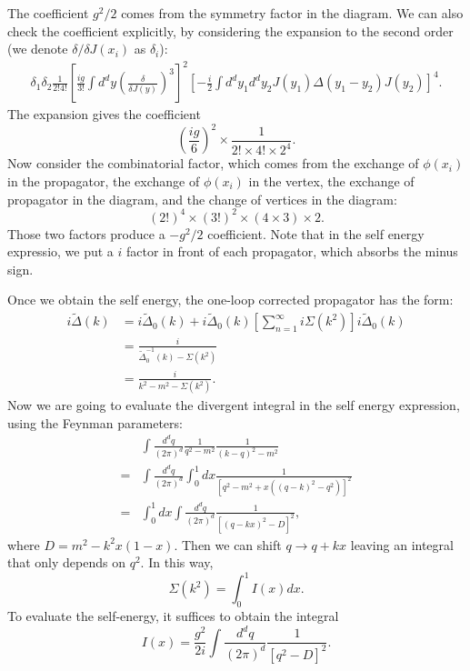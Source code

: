 The coefficient $g^2/2$ comes from the symmetry factor in the diagram. We can also check the coefficient explicitly, by considering the expansion to the second order (we denote $\delta/\delta J(x_i)$ as $\delta_i$):
\begin{equation*}
\begin{aligned}
	\delta_{1}\delta_{2}\frac{1}{2!4!}\left[\frac{ig}{3!}\int d^dy \left(\frac{\delta}{\delta J(y)}\right)^3 \right]^2
	\left[-\frac{i}{2}\int d^dy_1 d^dy_2 J(y_1)\Delta(y_1-y_2)J(y_2)\right]^4.
\end{aligned}
\end{equation*}
The expansion gives the coefficient
\begin{equation*}
	\left(\frac{ig}{6}\right)^2\times \frac{1}{2!\times 4! \times 2^4}.
\end{equation*}
Now consider the combinatorial factor, which comes from the exchange of $\phi(x_i)$ in the propagator, the exchange of $\phi(x_i)$ in the vertex, the exchange of propagator in the diagram, and the change of vertices in the diagram:
\begin{equation*}
	(2!)^4\times(3!)^2\times(4\times 3)\times2.
\end{equation*}
Those two factors produce a $-g^2/2$ coefficient.
Note that in the self energy expressio, we put a $i$ factor in front of each propagator, which absorbs the minus sign.


Once we obtain the self energy, the one-loop corrected propagator has the form:
\begin{equation}
\begin{aligned}
	i\tilde{\Delta}(k) 
	&= i\tilde{\Delta}_0(k) + i\tilde{\Delta}_0(k)\left[\sum_{n=1}^{\infty}i\Sigma(k^2)\right]i\tilde{\Delta}_0(k) \\
	&= \frac{i}{\tilde{\Delta}^{-1}_0(k) - \Sigma(k^2)} \\
	&= \frac{i}{k^2-m^2-\Sigma(k^2)}.
\end{aligned}
\end{equation}
Now we are going to evaluate the divergent integral in the self energy expression, using the Feynman parameters:
\begin{equation*}
\begin{aligned}
&\int \frac{d^d q}{(2 \pi)^d} \frac{1}{q^{2}-m^2} \frac{1}{(k-q)^{2}-m^2} \\
=&\int \frac{d^d q}{(2 \pi)^d} \int_{0}^{1} d x \frac{1}{\left[q^{2}-m^2+x\left((q-k)^{2}-q^{2}\right)\right]^{2}} \\
=&\int_{0}^{1} d x \int \frac{d^d q}{(2 \pi)^d} \frac{1}{\left[(q-kx)^{2}-D\right]^{2}},
\end{aligned}
\end{equation*}
where $D=m^2-k^{2} x(1-x)$. Then we can shift $q \rightarrow q+kx$ leaving an integral that only depends on $q^{2}$. In this way,
\begin{equation*}
\Sigma(k^2) = \int_0^1 I(x)dx.
\end{equation*}
To evaluate the self-energy, it suffices to obtain the integral
\begin{equation*}
I(x) = \frac{g^2}{2i}\int \frac{d^d q}{(2 \pi)^d} \frac{1}{\left[q^{2}-D\right]^{2}}.
\end{equation*}

